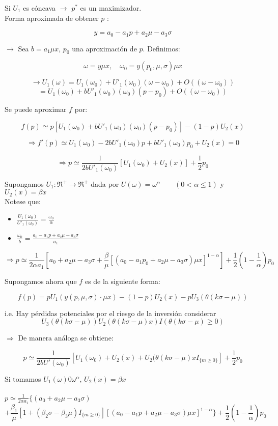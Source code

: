 Si $U_1$ es cóncava $\rightarrow$ $p^*$ es un maximizador.\\

 Forma aproximada de obtener $p$ :
 
 \[y=a_0-a_1p+a_2\mu-a_3\sigma\]
 
 $\rightarrow$ Sea $b=a_1\mu x$, $p_0$ una aproximación de $p$. Definimos:
 
 \[\omega=y\mu x,\quad \omega_0=y(p_0,\mu,\sigma)\mu x\]
 
 \[\rightarrow U_1(\omega)=U_1(\omega_0)+U'_1(\omega_0)(\omega-\omega_0)+O((\omega-\omega_0))\] 
 \[=U_1(\omega_0)+bU'_1(\omega_0)(\omega_0)(p-p_0)+O((\omega-\omega_0))\]
 
 Se puede aproximar $f$ por:
 
 \[f(p)\simeq p[U_1(\omega_0)+bU'_1(\omega_0)(\omega_0)(p-p_0)]-(1-p)U_2(x)\]
 
 \[\Rightarrow f'(p)\simeq U_1(\omega_0)-2bU'_1(\omega_0)p+bU'_1(\omega_0)p_0+U_2(x)=0\]
 
 \[\Rightarrow p\simeq \frac{1}{2bU'_1(\omega_0)}[U_1(\omega_0)+U_2(x)]+\frac{1}{2}p_0\]
 
Supongamos $U_1:\Re^+ \rightarrow \Re^+$ dada por $U(\omega)=\omega^\alpha\qquad(0<\alpha\le1)$ y $U_2(x)=\beta x$\\

Notese que:
\begin{itemize}
 \item ${\displaystyle\frac{U_1(\omega_0)}{U'_1(\omega_0)}=\frac{\omega_0}{\alpha}}$
 \item ${\displaystyle\frac{\omega_0}{b}=\frac{a_0-a_1p+a_2\mu-a_3\sigma}{a_1}}$
\end{itemize}

\[\Rightarrow p\simeq \frac{1}{2\alpha a_1}[a_0+a_2\mu-a_3\sigma+\frac{\beta}{\mu}[(a_0-a_1p_0+a_2\mu-a_3\sigma)\mu x]^{1-\alpha}]+\frac{1}{2}(1-\frac{1}{\alpha})p_0\]
 
Supongamos ahora que $f$ es de la siguiente forma:

\[f(p)=pU_1(y(p,\mu,\sigma)\cdot \mu x)-(1-p)U_2(x)-pU_3(\theta(k\sigma-\mu))\]
 
i.e. Hay pérdidas potenciales por el riesgo de la inversión considerar
\[U_3(\theta(k\sigma-\mu))U_2(\theta(k\sigma-\mu)x)I(\theta(k\sigma-\mu)\ge 0)\]
 
$\Rightarrow$ De manera análoga se obtiene:

\[p\simeq\frac{1}{2bU'(\omega_0)}[U_1(\omega_0)+U_2(x)+U_2(\theta(k\sigma-\mu)xI_{\{m\ge0\}}]+\frac{1}{2}p_0\]
 
\newpage 
Si tomamos $U_1(\omega)0\omega^\alpha$, $U_2(x)=\beta x$ \\\\
 
$p\simeq \frac{1}{2\alpha a_1}\{(a_0+a_2\mu-a_3\sigma)$
\[+\frac{\beta_1}{\mu}[1+(\beta_2\sigma-\beta_3 \mu)I_{\{m\ge0\}}][(a_0-a_1p+a_2\mu-a_3\sigma)\mu x]^{1-\alpha}\}+\frac{1}{2}(1-\frac{1}{\alpha})p_0\] 
 